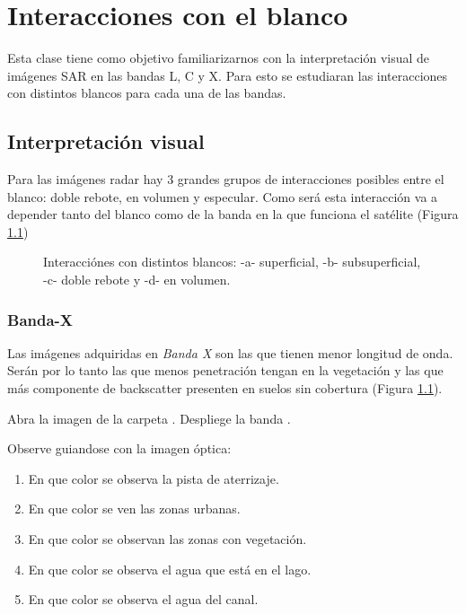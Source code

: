 \chapter{Interacciones con el blanco}

Esta clase tiene como objetivo familiarizarnos con la interpretación visual de imágenes SAR en las bandas L, C y X. Para esto se estudiaran las interacciones con distintos blancos para cada una de las bandas.

\section{Interpretación visual}

Para las imágenes radar hay 3 grandes grupos de interacciones posibles entre el blanco: doble rebote, en volumen y especular. Como será esta interacción va a depender tanto del blanco como de la banda en la que funciona el satélite (Figura \ref{fig:interacciones})

\begin{figure}[h!]
    \centering
    \caption{Interacciónes con distintos blancos: -a- superficial, -b- subsuperficial, -c- doble rebote y -d- en volumen.}
    \label{fig:interacciones}
\end{figure}

\subsection{Banda-X}

Las imágenes adquiridas en \emph{Banda X} son las que tienen menor longitud de onda. Serán por lo tanto las que menos penetración tengan en la vegetación y las que más componente de backscatter presenten en suelos sin cobertura (Figura \ref{fig:interacciones}).


Abra la imagen  de la carpeta . Despliege la banda .

Observe guiandose con la imagen óptica:

\begin{enumerate}
    \item En que color se observa la pista de aterrizaje.
    \item En que color se ven las zonas urbanas.
    \item En que color se observan las zonas con vegetación.
    \item En que color se observa el agua que está en el lago.
    \item En que color se observa el agua del canal.
\end{enumerate}

